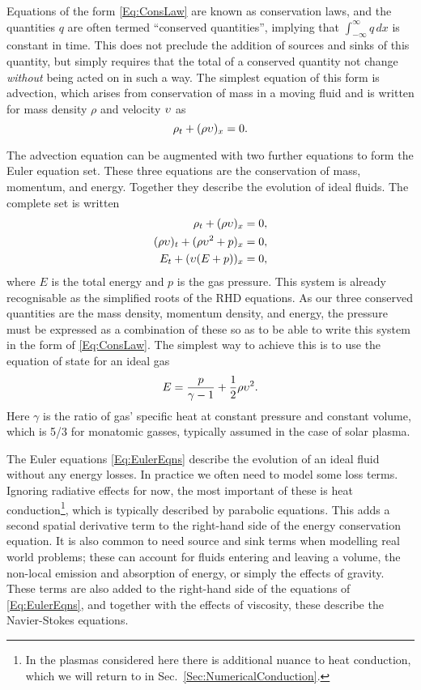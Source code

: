 Equations of the form \eqref{Eq:ConsLaw} are known as conservation laws, and the quantities $q$ are often termed ``conserved quantities'', implying that $\int_{-\infty}^{\infty} q\, dx$ is constant in time.
This does not preclude the addition of sources and sinks of this quantity, but simply requires that the total of a conserved quantity not change \emph{without} being acted on in such a way.
The simplest equation of this form is advection, which arises from conservation of mass in a moving fluid and is written for mass density $\rho$ and velocity $\upsilon$ as
\begin{equation}\label{Eq:Advection}
    \rho_t + (\rho \upsilon)_x = 0.
\end{equation}

The advection equation can be augmented with two further equations to form the Euler equation set.
These three equations are the conservation of mass, momentum, and energy.
Together they describe the evolution of ideal fluids.
The complete set is written
\begin{equation}\label{Eq:EulerEqns}
\begin{split}
    \rho_t + (\rho \upsilon)_x &= 0,\\
    (\rho \upsilon)_t + (\rho \upsilon^2 + p)_x &= 0,\\
    E_t + (\upsilon(E + p))_x &= 0,
\end{split}
\end{equation}
where $E$ is the total energy and $p$ is the gas pressure.
This system is already recognisable as the simplified roots of the RHD equations.
As our three conserved quantities are the mass density, momentum density, and energy, the pressure must be expressed as a combination of these so as to be able to write this system in the form of \eqref{Eq:ConsLaw}.
The simplest way to achieve this is to use the equation of state for an ideal gas
\begin{equation}
    E = \frac{p}{\gamma-1} + \frac{1}{2}\rho \upsilon^2.
\end{equation}
Here $\gamma$ is the ratio of gas' specific heat at constant pressure and constant volume, which is 5/3 for monatomic gasses, typically assumed in the case of solar plasma.

The Euler equations \eqref{Eq:EulerEqns} describe the evolution of an ideal fluid without any energy losses.
In practice we often need to model some loss terms.
Ignoring radiative effects for now, the most important of these is heat conduction\footnote{In the plasmas considered here there is additional nuance to heat conduction, which we will return to in Sec.~\ref{Sec:NumericalConduction}.}, which is typically described by parabolic equations.
This adds a second spatial derivative term to the right-hand side of the energy conservation equation.
It is also common to need source and sink terms when modelling real world problems; these can account for fluids entering and leaving a volume, the non-local emission and absorption of energy, or simply the effects of gravity.
These terms are also added to the right-hand side of the equations of \eqref{Eq:EulerEqns}, and together with the effects of viscosity, these describe the Navier-Stokes equations.

